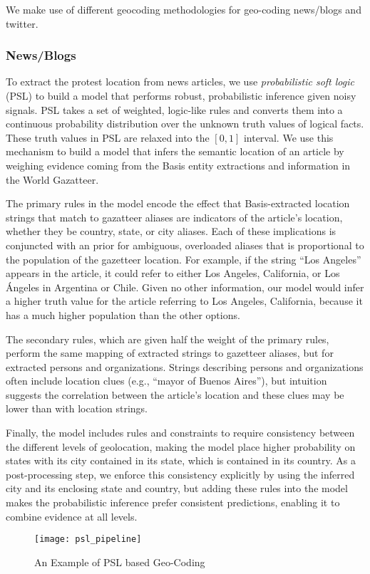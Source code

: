 %
%

We make use of different geocoding methodologies for geo-coding news/blogs and twitter.

\subsubsection{News/Blogs}
To extract the protest location from news articles, we use \emph{probabilistic soft logic} (PSL) \cite{broecheler:uai10} to build a model that performs robust, probabilistic inference given noisy signals. PSL takes a set of weighted, logic-like rules and converts them into a continuous probability distribution over the unknown truth values of logical facts. These truth values in PSL are relaxed into the $[0,1]$ interval. We use this mechanism to build a model that infers the semantic location of an article by weighing evidence coming from the Basis entity extractions and information in the World Gazatteer. 

The primary rules in the model encode the effect that Basis-extracted location strings that match to gazatteer aliases are indicators of the article's location, whether they be country, state, or city aliases. Each of these implications is conjuncted with an prior for ambiguous, overloaded aliases that is proportional to the population of the gazetteer location. For example, if the string ``Los Angeles'' appears in the article, it could refer to either Los Angeles, California, or Los \'{A}ngeles in Argentina or Chile. Given no other information, our model would infer a higher truth value for the article referring to Los Angeles, California, because it has a much higher population than the other options. 

The secondary rules, which are given half the weight of the primary rules, perform the same mapping of extracted strings to gazetteer aliases, but for extracted persons and organizations. Strings describing persons and organizations often include location clues (e.g., ``mayor of Buenos Aires''), but intuition suggests the correlation between the article's location and these clues may be lower than with location strings. 

Finally, the model includes rules and constraints to require consistency between the different levels of geolocation, making the model place higher probability on states with its city contained in its state, which is contained in its country. As a post-processing step, we enforce this consistency explicitly by using the inferred city and its enclosing state and country, but adding these rules into the model makes the probabilistic inference prefer consistent predictions, enabling it to combine evidence at all levels.
\begin{figure*}
    \texttt{[image: psl\_pipeline]}
    \caption{An Example of PSL based Geo-Coding}
    \label{fig:psl_example}
\end{figure*}
%

